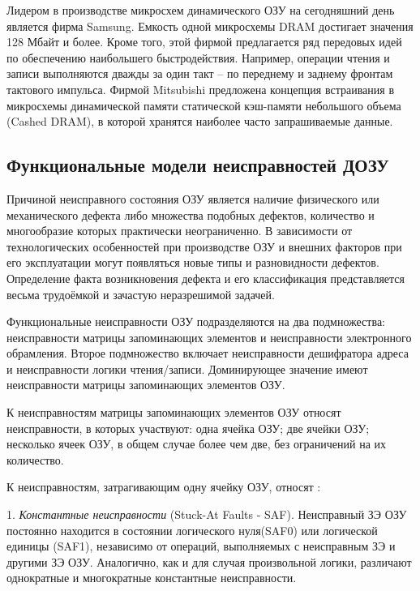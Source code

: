 Лидером в производстве микросхем динамического ОЗУ на сегодняшний день является фирма Samsung. Емкость одной микросхемы DRAM достигает значения 128 Мбайт и более. Кроме того, этой фирмой предлагается ряд передовых идей по обеспечению наибольшего быстродействия. Например, операции чтения и записи выполняются дважды за один такт – по переднему и заднему фронтам тактового импульса. Фирмой Mitsubishi предложена концепция встраивания в микросхемы динамической памяти статической кэш-памяти небольшого объема (Cashed DRAM), в которой хранятся наиболее часто запрашиваемые данные.

\subsection{Функциональные модели неисправностей ДОЗУ}
\label{sub:domain:faults}

\label{page:domain:faults}

Причиной неисправного состояния ОЗУ является наличие физического или механического дефекта либо множества подобных дефектов, количество и многообразие которых практически неограниченно. В зависимости от технологических особенностей при производстве ОЗУ и внешних факторов при его эксплуатации могут появляться новые типы и разновидности дефектов. Определение факта возникновения дефекта и его классификация представляется весьма трудоёмкой и зачастую неразрешимой задачей. 

Функциональные неисправности ОЗУ подразделяются на два подмножества: неисправности матрицы запоминающих элементов и неисправности электронного обрамления. Второе подмножество включает неисправности дешифратора адреса и неисправности логики чтения/записи. Доминирующее значение имеют неисправности матрицы запоминающих элементов ОЗУ.

К неисправностям матрицы запоминающих элементов ОЗУ относят неисправности, в которых участвуют: одна ячейка ОЗУ; две ячейки ОЗУ; несколько ячеек ОЗУ, в общем случае более чем две, без ограничений на их количество. 

К неисправностям, затрагивающим одну ячейку ОЗУ, относят \cite{faults}:

1. \textit{Константные неисправности} (Stuck-At Faults - SAF). Неисправный ЗЭ ОЗУ постоянно находится в состоянии логического нуля(SAF0) или логической единицы (SAF1), независимо от операций, выполняемых с неисправным ЗЭ и другими ЗЭ ОЗУ. Аналогично, как и для случая произвольной логики, различают однократные и многократные константные неисправности.


